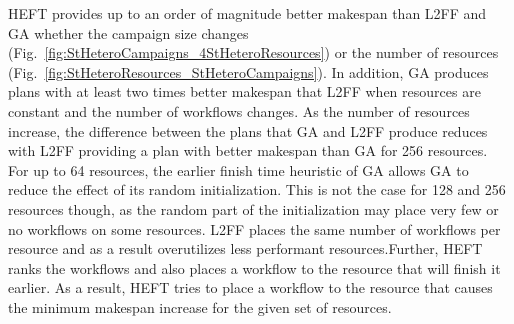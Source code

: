 HEFT provides up to an order of magnitude better makespan than L2FF and GA 
whether the campaign size changes 
(Fig.~\ref{fig:StHeteroCampaigns_4StHeteroResources}) or the number of 
resources (Fig.~\ref{fig:StHeteroResources_StHeteroCampaigns}). In addition, 
GA produces plans with at least two times better makespan that L2FF when 
resources are constant and the number of workflows changes. As the number of 
resources increase, the difference between the plans that GA and L2FF produce 
reduces with L2FF providing a plan with better makespan than GA for 256 
resources. For up to 64 resources, the earlier finish time heuristic of GA 
allows GA to reduce the effect of its random initialization. This is not the 
case for 128 and 256 resources though, as the random part of the 
initialization may place very few or no workflows on some resources. L2FF 
places the same number of workflows per resource and as a result overutilizes 
less performant resources.Further, HEFT ranks the workflows and also places a 
workflow to the resource that will finish it earlier. As a result, HEFT tries 
to place a workflow to the resource that causes the minimum makespan increase 
for the given set of resources.


